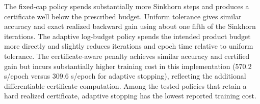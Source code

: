 \documentclass[10pt]{article}
\numberwithin{equation}{section}
\theoremstyle{plain}
\theoremstyle{definition}
\theoremstyle{remark}
\begin{document}
The fixed-cap policy spends substantially more Sinkhorn steps and produces a certificate
well below the prescribed budget. Uniform tolerance gives similar accuracy and exact
realized backward gain using about one fifth of the Sinkhorn iterations. The adaptive
log-budget policy spends the intended product budget more directly and slightly reduces
iterations and epoch time relative to uniform tolerance. The certificate-aware penalty
achieves similar accuracy and certified gain but incurs substantially higher training cost
in this implementation (570.2 s/epoch versus 309.6 s/epoch for adaptive stopping),
reflecting the additional differentiable certificate computation. Among the tested policies that retain a hard realized certificate, adaptive stopping has the lowest reported training cost.
\end{document}

